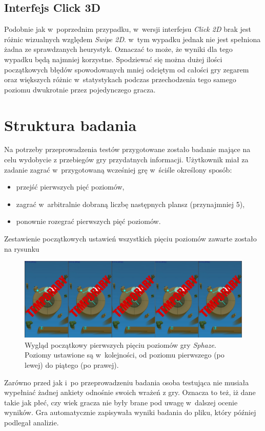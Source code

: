 \documentclass[a4paper,12pt,numbers=noenddot]{report}
\begin{document}
\subsection{Interfejs Click 3D}
Podobnie jak w~poprzednim przypadku, w~wersji interfejsu \textit{Click 2D} brak jest różnic wizualnych względem \textit{Swipe 2D}. w~tym wypadku jednak nie jest spełniona żadna ze sprawdzanych heurystyk. Oznaczać to może, że wyniki dla tego wypadku będą najmniej korzystne. Spodziewać się można dużej ilości początkowych błędów spowodowanych mniej odciętym od całości gry zegarem oraz większych różnic w~statystykach podczas przechodzenia tego samego poziomu dwukrotnie przez pojedynczego gracza.
\section{Struktura badania}
Na potrzeby przeprowadzenia testów przygotowane zostało badanie mające na celu wydobycie z przebiegów gry przydatnych informacji. 
Użytkownik miał za zadanie zagrać w~przygotowaną wcześniej grę w~ściśle określony sposób:
\begin{itemize}
\item przejść pierwszych pięć poziomów,
\item zagrać w~arbitralnie dobraną liczbę następnych plansz (przynajmniej 5),
\item ponownie rozegrać pierwszych pięć poziomów.
\end{itemize}

Zestawienie początkowych ustawień wszystkich pięciu poziomów zawarte zostało na rysunku 
\begin{figure}[h!]
	\centering
  	\includegraphics[width=\linewidth]{fig/tmp5.jpg}
	\caption{Wygląd początkowy pierwszych pięciu poziomów gry \textit{Sphaze}. Poziomy ustawione są w~kolejności, od poziomu pierwszego (po lewej) do piątego (po prawej).}
	\label{fig:all_levels}
\end{figure}
Zarówno przed jak i~po przeprowadzeniu badania osoba testująca nie musiała wypełniać żadnej ankiety odnośnie swoich wrażeń z gry. Oznacza to też, iż dane takie jak płeć, czy wiek gracza nie były brane pod uwagę w~dalszej ocenie wyników. Gra automatycznie zapisywała wyniki badania do pliku, który później podlegał analizie.
\end{document}
